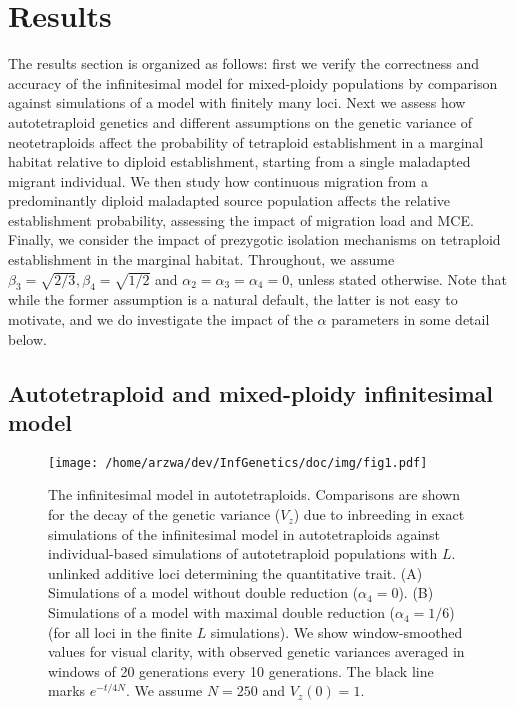 \documentclass[12pt,a4paper]{article}
\begin{document}
\section*{Results}

The results section is organized as follows: first we verify the correctness
and accuracy of the infinitesimal model for mixed-ploidy populations by
comparison against simulations of a model with finitely many loci.
Next we assess how autotetraploid genetics and different assumptions on the
genetic variance of neotetraploids affect the probability of tetraploid
establishment in a marginal habitat relative to diploid establishment, starting
from a single maladapted migrant individual.
We then study how continuous migration from a predominantly diploid maladapted
source population affects the relative establishment probability, assessing the
impact of migration load and MCE.
Finally, we consider the impact of prezygotic isolation mechanisms on
tetraploid establishment in the marginal habitat.
Throughout, we assume $\beta_3 = \sqrt{2/3}, \beta_4=\sqrt{1/2}$
and $\alpha_2 = \alpha_3 = \alpha_4 = 0$, unless stated otherwise.
Note that while the former assumption is a natural default, the latter is not
easy to motivate, and we do investigate the impact of the $\alpha$ parameters
in some detail below.

\subsection*{Autotetraploid and mixed-ploidy infinitesimal model}

\begin{figure}[t]
\centering
\texttt{[image: /home/arzwa/dev/InfGenetics/doc/img/fig1.pdf]}
\caption{
The infinitesimal model in autotetraploids.
Comparisons are shown for the decay of the genetic variance ($V_z$) due to
inbreeding in exact simulations of the infinitesimal model in autotetraploids
against individual-based simulations of autotetraploid populations with $L$.
unlinked additive loci determining the quantitative trait. 
(A) Simulations of a model without double reduction ($\alpha_4=0$).
(B) Simulations of a model with maximal double reduction ($\alpha_4=1/6$) (for
all loci in the finite $L$ simulations).
We show window-smoothed values for visual clarity, with observed genetic
variances averaged in windows of 20 generations every 10 generations.
The black line marks $e^{-t/4N}$. 
We assume $N=250$ and $V_z(0) = 1$.
\label{fig:vztet}}
\end{figure}
\end{document}
